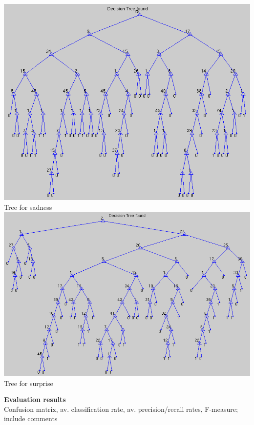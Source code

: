 \documentclass[12pt]{article}
\begin{document}
\begin{center}
  \includegraphics[scale=0.28]{report-images/tree5.png} \\
  Tree for sadness \\
  \vspace{\baselineskip}
  \includegraphics[scale=0.28]{report-images/tree6.png} \\
  Tree for surprise
\end{center}

\newpage

{\bf Evaluation results} \\
Confusion matrix, av. classification rate, av. precision/recall rates, F-measure; include comments \\ \\
\end{document}
